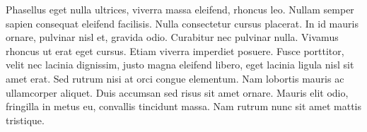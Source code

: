 \documentclass{article}
\begin{document}
\begin{pages}
\begin{Rightside}
Phasellus eget nulla ultrices, viverra massa eleifend, rhoncus leo. Nullam semper sapien consequat eleifend facilisis. Nulla consectetur cursus placerat. In id mauris ornare, pulvinar nisl et, gravida odio. Curabitur nec pulvinar nulla. Vivamus rhoncus ut erat eget cursus. Etiam viverra imperdiet posuere. Fusce porttitor, velit nec lacinia dignissim, justo magna eleifend libero, eget lacinia ligula nisl sit amet erat. Sed rutrum nisi at orci congue elementum. Nam lobortis mauris ac ullamcorper aliquet. Duis accumsan sed risus sit amet ornare. Mauris elit odio, fringilla in metus eu, convallis tincidunt massa. Nam rutrum nunc sit amet mattis tristique.

\pend
\endnumbering
\end{Rightside}
\Pages
\end{pages}
\end{document}
